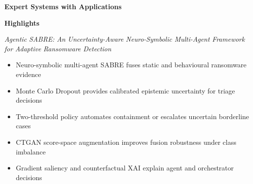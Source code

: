 \documentclass[12pt,a4paper]{article}
\begin{document}
\noindent\textbf{\large Expert Systems with Applications}

\bigskip

\noindent\textbf{\Large Highlights}

\bigskip

\noindent\textit{Agentic SABRE: An Uncertainty-Aware Neuro-Symbolic Multi-Agent Framework
for Adaptive Ransomware Detection}

\bigskip

\begin{itemize}[leftmargin=1.5em, itemsep=10pt, label=\textbullet]
  \item Neuro-symbolic multi-agent SABRE fuses static and behavioural ransomware evidence
  \item Monte Carlo Dropout provides calibrated epistemic uncertainty for triage decisions
  \item Two-threshold policy automates containment or escalates uncertain borderline cases
  \item CTGAN score-space augmentation improves fusion robustness under class imbalance
  \item Gradient saliency and counterfactual XAI explain agent and orchestrator decisions
\end{itemize}
\end{document}
